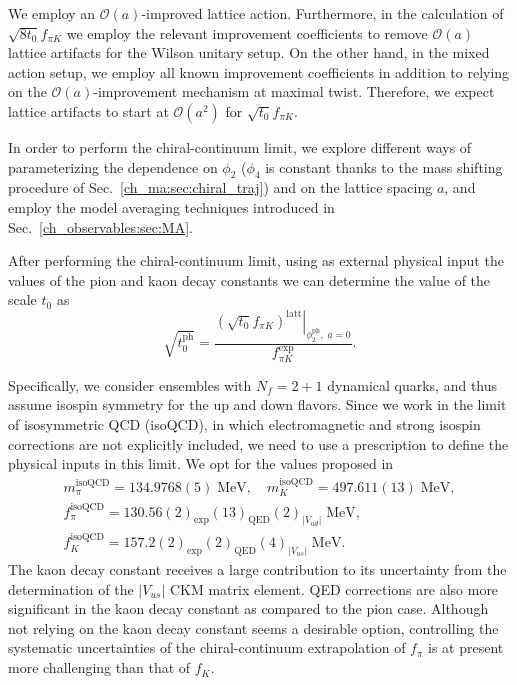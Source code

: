 We employ an $\mathcal{O}(a)$-improved lattice action. Furthermore, in the calculation of $\sqrt{8t_0}f_{\pi K}$ we  employ the relevant improvement coefficients to remove $\mathcal{O}(a)$ lattice artifacts for the Wilson unitary setup. On the other hand, in the mixed action setup, we employ all known improvement coefficients in addition to relying on the $\mathcal{O}(a)$-improvement mechanism at maximal twist. Therefore, we expect lattice artifacts to start at $\mathcal{O}(a^2)$ for $\sqrt{t_0}f_{\pi K}$.

In order to perform the chiral-continuum limit, we explore different ways of parameterizing the dependence on $\phi_2$ ($\phi_4$ is constant thanks to the mass shifting procedure of Sec.~\ref{ch_ma:sec:chiral_traj}) and on the lattice spacing $a$, and employ the model averaging techniques introduced in Sec.~\ref{ch_observables:sec:MA}.

After performing the chiral-continuum limit, using as external physical input the values of the pion and kaon decay constants we can determine the value of the scale $t_0$ as
\begin{equation}
\sqrt{t_0^{\textrm{ph}}}=\frac{\left.\left(\sqrt{t_0}f_{\pi K}\right)^{\textrm{latt}}\right|_
{\phi_2^{\textrm{ph}},\;a=0}}{f_{\pi K}^{\textrm{exp}}}.
\end{equation}

Specifically, we consider ensembles with $N_f=2+1$ dynamical quarks, and thus assume isospin symmetry for the up and down flavors. Since we work in the limit of isosymmetric QCD (isoQCD), in which electromagnetic and strong isospin corrections are not explicitly included, we need to use a prescription to define the physical inputs in this limit. We opt for the values proposed in~\citep{FlavourLatticeAveragingGroupFLAG:2021npn}
\begin{gather}
\label{ch_ss:eq:isoQCD}
m_{\pi}^{\textrm{isoQCD}}=134.9768(5)\;{\textrm{MeV}}, \quad
m_{K}^{\textrm{isoQCD}}=497.611(13)\;{\textrm{MeV}}, \\
\label{ch_ss:eq:isoQCD_fpi}
f_{\pi}^{\textrm{isoQCD}}=130.56(2)_{\textrm{exp}}(13)_{\textrm{QED}}(2)_{|V_{ud}|}\;{\textrm{MeV}}, \quad \\
\label{ch_ss:eq:isoQCD_fk}
f_{K}^{\textrm{isoQCD}}=157.2(2)_{\textrm{exp}}(2)_{\textrm{QED}}(4)_{|V_{us}|}\;{\textrm{MeV}}.
\end{gather} 
The kaon decay constant receives a large contribution to its uncertainty from the determination of the $|V_{us}|$ CKM matrix element. QED corrections are also more significant in the kaon decay constant as compared to the pion case. Although not relying on the kaon decay constant seems a desirable option, controlling the systematic uncertainties of the chiral-continuum extrapolation of $f_{\pi}$ is  at present more challenging than that of $f_K$. 

